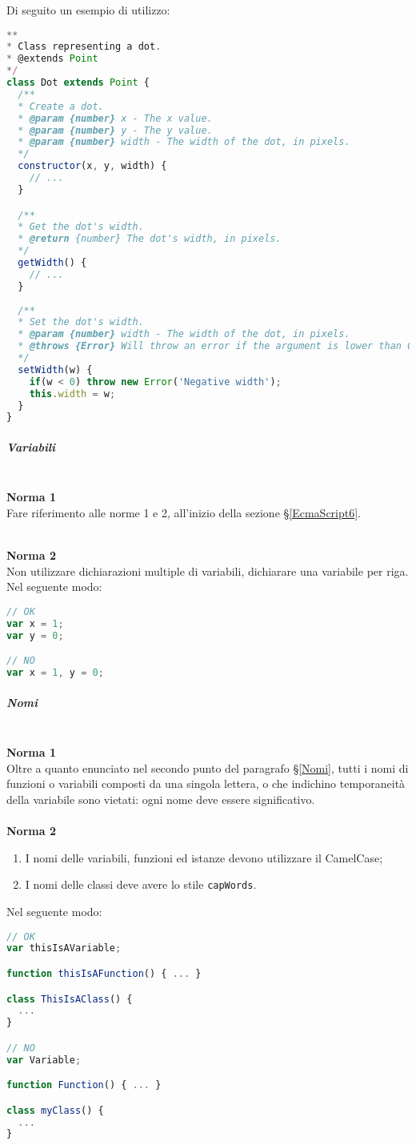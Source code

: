 Di seguito un esempio di utilizzo:
\begin{lstlisting}[language=JavaScript]
**
* Class representing a dot.
* @extends Point
*/
class Dot extends Point {
  /**
  * Create a dot.
  * @param {number} x - The x value.
  * @param {number} y - The y value.
  * @param {number} width - The width of the dot, in pixels.
  */
  constructor(x, y, width) {
    // ...
  }

  /**
  * Get the dot's width.
  * @return {number} The dot's width, in pixels.
  */
  getWidth() {
    // ...
  }
  
  /**
  * Set the dot's width.
  * @param {number} width - The width of the dot, in pixels.
  * @throws {Error} Will throw an error if the argument is lower than 0.
  */
  setWidth(w) {
    if(w < 0) throw new Error('Negative width');
    this.width = w;
  }
}
\end{lstlisting}

\subparagraph{Variabili}\-\\
\textbf{Norma 1}\\
Fare riferimento alle norme 1 e 2, all'inizio della sezione §\ref{EcmaScript6}.

\-\\
\textbf{Norma 2}\\
Non utilizzare dichiarazioni multiple di variabili, dichiarare una variabile per riga.\\
Nel seguente modo:
\begin{lstlisting}[language=JavaScript]
// OK
var x = 1;
var y = 0;

// NO
var x = 1, y = 0;
\end{lstlisting}


\subparagraph{Nomi}\-\\
\textbf{Norma 1}\\
 Oltre a quanto enunciato nel secondo punto del paragrafo §\ref{Nomi}, tutti i nomi di funzioni o variabili composti da una singola lettera, o che indichino temporaneità della variabile sono vietati: ogni nome deve essere significativo.\\
\-\\
\textbf{Norma 2} 
\begin{enumerate}
	\item I nomi delle variabili, funzioni ed istanze devono utilizzare il CamelCase;
	\item I nomi delle classi deve avere lo stile \texttt{capWords}.
\end{enumerate}
Nel seguente modo:
\begin{lstlisting}[language=JavaScript]
// OK
var thisIsAVariable;

function thisIsAFunction() { ... }

class ThisIsAClass() {
  ...
}

// NO
var Variable;

function Function() { ... }

class myClass() {
  ...
}
\end{lstlisting}
